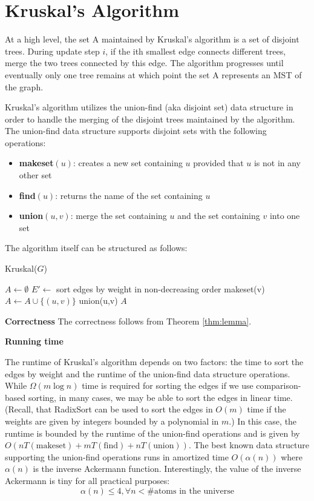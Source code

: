 \documentclass [12pt]{article}
\theoremstyle{definition}
\begin{document}
\section{Kruskal's Algorithm} 

At a high level, the set A maintained by Kruskal's algorithm is a set of disjoint trees. During update step $i$, if the ith smallest edge connects different trees, merge the two trees connected by this edge. The algorithm progresses until eventually only one tree remains at which point the set A represents an MST of the graph.

Kruskal's algorithm utilizes the union-find (aka disjoint set) data structure in order to handle the merging of the disjoint trees maintained by the algorithm. The union-find data structure supports disjoint sets with the following operations:

\begin{itemize}
\item \textbf{makeset}$(u)$: creates a new set containing $u$ provided that $u$ is not in any other set
\item \textbf{find}$(u)$: returns the name of the set containing $u$
\item \textbf{union}$(u, v )$: merge the set containing $u$ and the set containing $v$ into one set
\end{itemize}

The algorithm itself can be structured as follows:

\begin{algorithm}
\caption{Kruskal($G$)}
\label{alg:kruskal_algorithm}
\begin{algorithmic}
\State $A \gets \emptyset$
\State $E' \gets$ sort edges by weight in non-decreasing order
\State {} {
    \State makeset(v)
}
\State {} {
     {
        \State $A \gets A \cup \{(u,v)\}$
        \State union(u,v)
    }
}
\State \Return $A$
\end{algorithmic}
\end{algorithm}

\textbf{Correctness} The correctness follows from Theorem \ref{thm:lemma}.


\textbf{Running time} 

The runtime of Kruskal's algorithm depends on two factors: the time to sort the edges by weight and the runtime of the union-find data structure operations. While $\Omega(m \log n)$ time is required for sorting the edges if we use comparison-based sorting, in many cases, we may be able to sort the edges in linear time. (Recall, that RadixSort can be used to sort the edges in $O(m)$ time if the weights are given by integers bounded by a polynomial in $m$.) In this case, the runtime is bounded by the runtime of the union-find operations and is given by $O(nT(\text{makeset}) + mT(\text{find}) +nT(\text{union}))$. The best known data structure supporting the union-find operations runs in amortized time $O(\alpha(n))$ where $\alpha(n)$ is the inverse Ackermann function. Interestingly, the value of the inverse Ackermann is tiny for all practical purposes: 
$$
\alpha(n) \leq 4, \forall n < \text{\# atoms in the universe}
$$
\end{document}
